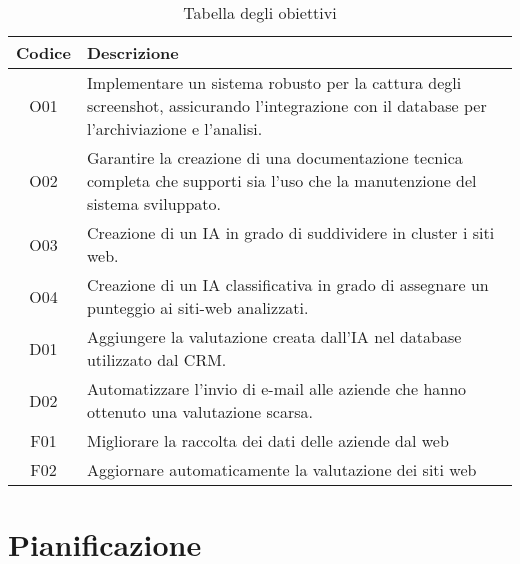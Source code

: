 \begin{table}[h!]
    \centering
    \begin{tabularx}{0.8\textwidth}{|c|X|}
    \hline
    \textbf{Codice} & \textbf{Descrizione} \\
    \hline
    O01 & Implementare un sistema robusto per la cattura degli screenshot, assicurando l’integrazione con il database per l’archiviazione e l’analisi. \\
    \hline
    O02 & Garantire la creazione di una documentazione tecnica completa che supporti sia l’uso che la manutenzione  del sistema sviluppato. \\
    \hline
    O03 & Creazione di un IA in grado di suddividere in cluster i siti web. \\
    \hline
    O04 & Creazione di un IA classificativa in grado di assegnare un punteggio ai siti-web analizzati.\\
    \hline
    D01 & Aggiungere la valutazione creata dall'IA nel database utilizzato dal CRM.\\
    \hline
    D02 & Automatizzare l'invio di e-mail alle aziende che hanno ottenuto una valutazione scarsa.\\
    \hline
    F01 & Migliorare la raccolta dei dati delle aziende dal web\\
    \hline
    F02 & Aggiornare automaticamente la valutazione dei siti web\\
    \hline
    \end{tabularx}
    \caption{Tabella degli obiettivi}
    \end{table}

\section{Pianificazione}
